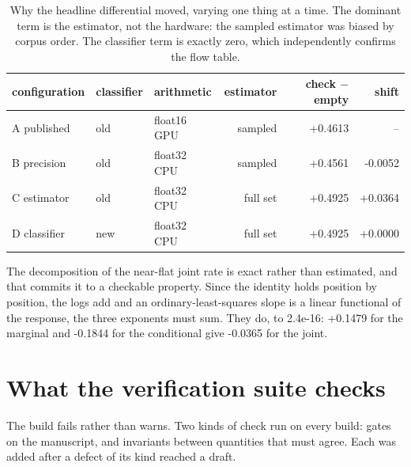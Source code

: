 \documentclass[11pt]{article}
\begin{document}
\begin{table}[htbp]
\centering\small
\caption{Why the headline differential moved, varying one thing at a time. The dominant term is the estimator, not the hardware: the sampled estimator was biased by corpus order. The classifier term is exactly zero, which independently confirms the flow table.}
\label{tab:s-drift}
\begin{tabular}{lllrrr}
\toprule
configuration & classifier & arithmetic & estimator & check $-$ empty & shift \\
\midrule
A published & old & float16 GPU & sampled & +0.4613 & -- \\
B precision & old & float32 CPU & sampled & +0.4561 & -0.0052 \\
C estimator & old & float32 CPU & full set & +0.4925 & +0.0364 \\
D classifier & new & float32 CPU & full set & +0.4925 & +0.0000 \\
\bottomrule
\end{tabular}
\end{table}

The decomposition of the near-flat joint rate is exact rather than estimated, and that commits it to a checkable property. Since the identity holds position by position, the logs add and an ordinary-least-squares slope is a linear functional of the response, the three exponents must sum. They do, to 2.4e-16: +0.1479 for the marginal and -0.1844 for the conditional give -0.0365 for the joint.

\section{What the verification suite checks}

The build fails rather than warns. Two kinds of check run on every build: gates on the manuscript, and invariants between quantities that must agree. Each was added after a defect of its kind reached a draft.
\end{document}
